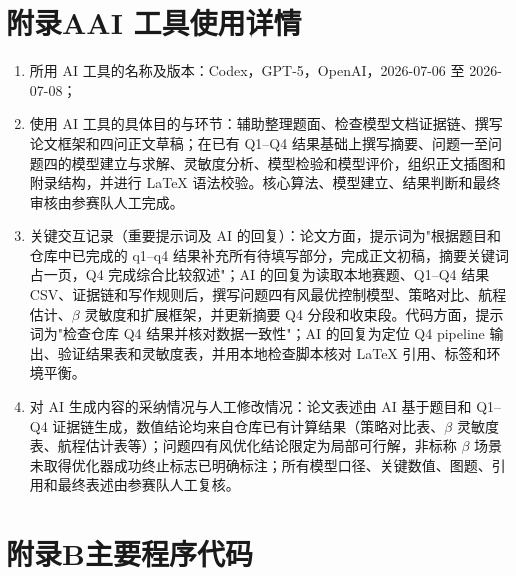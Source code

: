 \documentclass[withoutpreface,bwprint]{cumcmthesis}
\renewcommand{\thesection}{\chinese{section}、}
\begin{document}
\appendix
\renewcommand{\thesection}{附录\Alph{section}}

\section*{附录A\quad AI 工具使用详情}

\begin{enumerate}[left=0pt]
\item 所用 AI 工具的名称及版本：Codex，GPT-5，OpenAI，2026-07-06 至 2026-07-08\cite{codex}；
\item 使用 AI 工具的具体目的与环节：辅助整理题面、检查模型文档证据链、撰写论文框架和四问正文草稿；在已有 Q1--Q4 结果基础上撰写摘要、问题一至问题四的模型建立与求解、灵敏度分析、模型检验和模型评价，组织正文插图和附录结构，并进行 \LaTeX{} 语法校验。核心算法、模型建立、结果判断和最终审核由参赛队人工完成。
\item 关键交互记录（重要提示词及 AI 的回复）：论文方面，提示词为"根据题目和仓库中已完成的 q1--q4 结果补充所有待填写部分，完成正文初稿，摘要关键词占一页，Q4 完成综合比较叙述"；AI 的回复为读取本地赛题、Q1--Q4 结果 CSV、证据链和写作规则后，撰写问题四有风最优控制模型、策略对比、航程估计、$\beta$ 灵敏度和扩展框架，并更新摘要 Q4 分段和收束段。代码方面，提示词为"检查仓库 Q4 结果并核对数据一致性"；AI 的回复为定位 Q4 pipeline 输出、验证结果表和灵敏度表，并用本地检查脚本核对 \LaTeX{} 引用、标签和环境平衡。
\item 对 AI 生成内容的采纳情况与人工修改情况：论文表述由 AI 基于题目和 Q1--Q4 证据链生成，数值结论均来自仓库已有计算结果（策略对比表、$\beta$ 灵敏度表、航程估计表等）；问题四有风优化结论限定为局部可行解，非标称 $\beta$ 场景未取得优化器成功终止标志已明确标注；所有模型口径、关键数值、图题、引用和最终表述由参赛队人工复核。
\end{enumerate}
\newpage
\section*{附录B\quad 主要程序代码}
\end{document}
